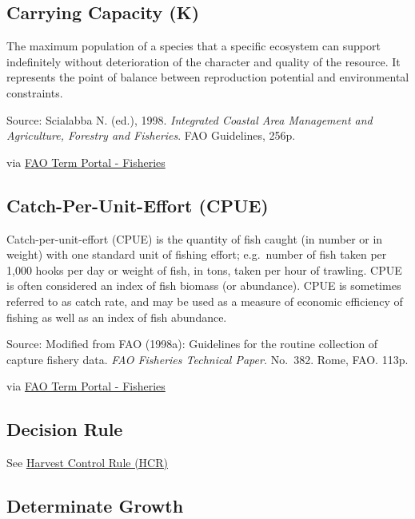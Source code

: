 \documentclass[
  11pt,
]{book}
\begin{document}
\hypertarget{carrying-capacity-k}{%
\subsection{Carrying Capacity (K)}\label{carrying-capacity-k}}

The maximum population of a species that a specific ecosystem can support indefinitely without deterioration of the character and quality of the resource. It represents the point of balance between reproduction potential and environmental constraints.

Source: Scialabba N. (ed.), 1998. \emph{Integrated Coastal Area Management and Agriculture, Forestry and Fisheries}. FAO Guidelines, 256p.

via \href{http://www.fao.org/fishery/glossary/en}{FAO Term Portal - Fisheries}

\hypertarget{catch-per-unit-effort-cpue}{%
\subsection{Catch-Per-Unit-Effort (CPUE)}\label{catch-per-unit-effort-cpue}}

Catch-per-unit-effort (CPUE) is the quantity of fish caught (in number or in weight) with one standard unit of fishing effort; e.g.~number of fish taken per 1,000 hooks per day or weight of fish, in tons, taken per hour of trawling. CPUE is often considered an index of fish biomass (or abundance). CPUE is sometimes referred to as catch rate, and may be used as a measure of economic efficiency of fishing as well as an index of fish abundance.

Source: Modified from FAO (1998a): Guidelines for the routine collection of capture fishery data. \emph{FAO Fisheries Technical Paper.} No.~382. Rome, FAO. 113p.

via \href{http://www.fao.org/fishery/glossary/en}{FAO Term Portal - Fisheries}

\hypertarget{decision-rule}{%
\subsection{Decision Rule}\label{decision-rule}}

See \protect\hyperlink{harvest-control-rule-hcr}{Harvest Control Rule (HCR)}

\hypertarget{determinate-growth}{%
\subsection{Determinate Growth}\label{determinate-growth}}
\end{document}
